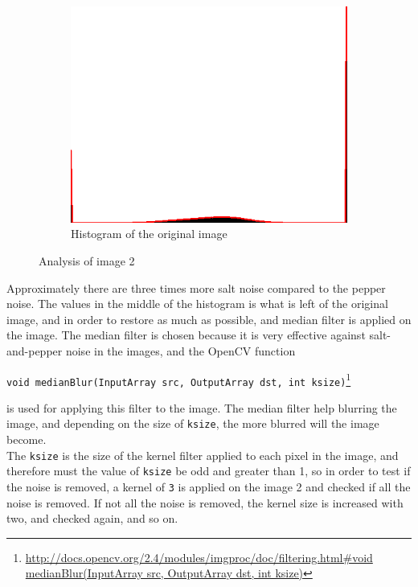 \begin{figure}[H]
\begin{subfigure}[b]{0.446\textwidth}
        \includegraphics[width=\textwidth]{img2/hist.png}
        \caption{Histogram of the original image}
        \label{fig:img2_hist}
    \end{subfigure}
    \caption{Analysis of image 2}\label{fig:img2}
\end{figure}

Approximately  there are three times more salt noise compared to the pepper noise. The values in the middle of the histogram is what is left of the original image, and in order to restore as much as possible, and median filter is applied on the image. The median filter is chosen because it is very effective against salt-and-pepper noise in the images, and the OpenCV function
\begin{center}
\lstinline|void medianBlur(InputArray src, OutputArray dst, int ksize)|\footnote{\url{http://docs.opencv.org/2.4/modules/imgproc/doc/filtering.html\#void medianBlur(InputArray src, OutputArray dst, int ksize)}}
\end{center}
is used for applying this filter to the image. The median filter help blurring the image, and depending on the size of \lstinline|ksize|, the more blurred will the image become.\\[0.2cm]
The \lstinline|ksize| is the size of the kernel filter applied to each pixel in the image, and therefore must the value of \lstinline|ksize| be odd and greater than 1, so in order to test if the noise is removed, a kernel of \lstinline|3| is applied on the image 2 and checked if all the noise is removed. If not all the noise is removed, the kernel size is increased with two, and checked again, and so on.  


